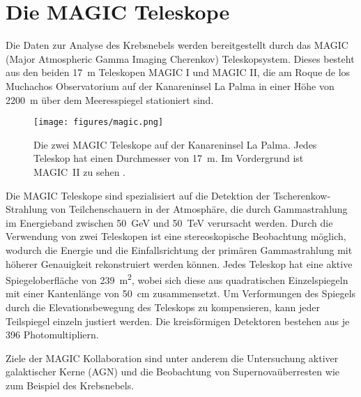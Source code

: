 \section{Die MAGIC Teleskope}
\label{sec:teleskop}

Die Daten zur Analyse des Krebsnebels werden bereitgestellt durch das MAGIC
(Major Atmospheric Gamma Imaging Cherenkov) Teleskopsystem. Dieses besteht aus
den beiden \SI{17}{\metre} Teleskopen MAGIC I und MAGIC II, die am Roque de
los Muchachos Observatorium auf der Kanareninsel La Palma in einer Höhe von
\SI{2200}{\metre} über dem Meeresspiegel stationiert sind.

\begin{figure}
  \centering
  \texttt{[image: figures/magic.png]}
  \caption{Die zwei MAGIC Teleskope auf der Kanareninsel La Palma. Jedes
  Teleskop hat einen Durchmesser von \SI{17}{\metre}. Im Vordergrund ist
  MAGIC~II zu sehen \cite{magic}.} %
  \label{fig:telescope}
\end{figure}

Die MAGIC Teleskope sind spezialisiert auf die Detektion der Tscherenkow-Strahlung
von Teilchenschauern in der Atmosphäre, die durch Gammastrahlung im Energieband
zwischen \SI{50}{\giga\electronvolt} und \SI{50}{\tera\electronvolt} verursacht werden.
Durch die Verwendung von zwei Teleskopen ist eine stereoskopische Beobachtung
möglich, wodurch die Energie und die Einfallsrichtung der primären
Gammastrahlung mit höherer Genauigkeit rekonstruiert werden können. Jedes Teleskop
hat eine aktive Spiegeloberfläche von \SI{239}{\metre\squared}, wobei sich diese
aus quadratischen Einzelspiegeln mit einer Kantenlänge von \SI{50}{\centi\metre}
zusammensetzt. Um Verformungen des Spiegels durch die Elevationsbewegung des
Teleskops zu kompensieren, kann jeder Teilspiegel einzeln justiert werden. Die
kreisförmigen Detektoren bestehen aus je 396 Photomultipliern.

Ziele der MAGIC Kollaboration sind unter anderem die Untersuchung aktiver
galaktischer Kerne (AGN) und die Beobachtung von Supernovaüberresten wie zum
Beispiel des Krebsnebels.
